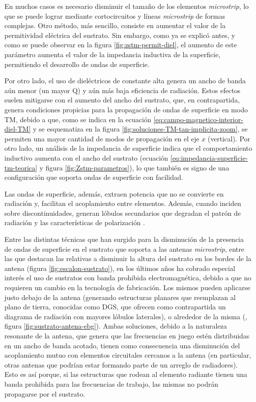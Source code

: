 En muchos casos es necesario disminuir el tamaño de los elementos \textit{microstrip}, lo que se puede lograr mediante cortocircuitos y líneas \textit{microstrip} de formas complejas. Otro método, más sencillo, consiste en aumentar el valor de la permitividad eléctrica del sustrato. Sin embargo, como ya se explicó antes, y como se puede observar en la figura \ref{fig:zstm-permit-diel}, el aumento de este parámetro aumenta el valor de la impedancia inductiva de la superficie, permitiendo el desarrollo de ondas de superficie.

Por otro lado, el uso de dieléctricos de constante alta genera un ancho de banda aún menor (un mayor Q) y aún más baja eficiencia de radiación. Estos efectos suelen mitigarse con el aumento del ancho del sustrato, que, en contrapartida, genera condiciones propicias para la propagación de ondas de superficie en modo TM, debido a que, como se indica en la ecuación \ref{eq:campo-magnetico-interior-diel-TM} y se esquematiza en la figura \ref{fig:soluciones-TM-tan-implicita-zoom}, se permiten una mayor cantidad de modos de propagación en el eje $x$ (vertical). Por otro lado, un análisis de la impedancia de superficie indica que el comportamiento inductivo aumenta con el ancho del sustrato (ecuación \ref{eq:impedancia-superficie-tm-teorica} y figura \ref{fig:Zstm-parametros}), lo que también es signo de una configuración que soporta ondas de superficie con facilidad.

Las ondas de superficie, además, extraen potencia que no se convierte en radiación y, facilitan el acoplamiento entre elementos. Además, cuando inciden sobre discontinuidades, generan lóbulos secundarios que degradan el patrón de radiación y las características de polarización \cite{Balanis:Theory}.

Entre las distintas técnicas que han surgido para la disminución de la presencia de ondas de superficie en el sustrato que soporta a las antenas \textit{microstrip}, entre las que destacan las relativas a disminuir la altura del sustrato en los bordes de la antena (figura \ref{fig:escalon-sustrato}), en los últimos años ha cobrado especial interés el uso de sustratos con banda prohibida electromagnética, debido a que no requieren un cambio en la tecnología de fabricación. Los mismos pueden aplicarse justo debajo de la antena (generando estructuras planares que reemplazan al plano de tierra, conocidas como DGS, que ofrecen como contrapartida un diagrama de radiación con mayores lóbulos laterales), o alrededor de la misma (\cite{Marcela:Tesis}, figura \ref{fig:sustrato-antena-ebg}). Ambas soluciones, debido a la naturaleza resonante de la antena, que genera que las frecuencias en juego estén distribuidas en un ancho de banda acotado, tienen como consecuencia una disminución del acoplamiento mutuo con elementos circuitales cercanos a la antena (en particular, otras antenas que podrían estar formando parte de un arreglo de radiadores). Esto es así porque, si las estructuras que rodean al elemento radiante tienen una banda prohibida para las frecuencias de trabajo, las mismas no podrán propagarse por el sustrato.


